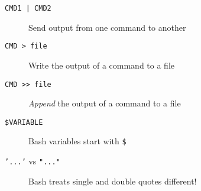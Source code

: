 \documentclass[a4paper]{tufte-handout}
\begin{document}
\begin{description}
    \item [\texttt{CMD1 | CMD2}]
        \hfill Send output from one command to another
    \item [\texttt{CMD > file}]
        \hfill Write the output of a command to a file
    \item [\texttt{CMD >{}> file}]
        \hfill \emph{Append} the output of a command to a file
    \item [\texttt{\$VARIABLE}]
        \hfill Bash variables start with \texttt{\$}
    \item [\texttt{'...'} vs \texttt{"..."}]
        \hfill Bash treats single and double quotes different!
\end{description}
\end{document}
